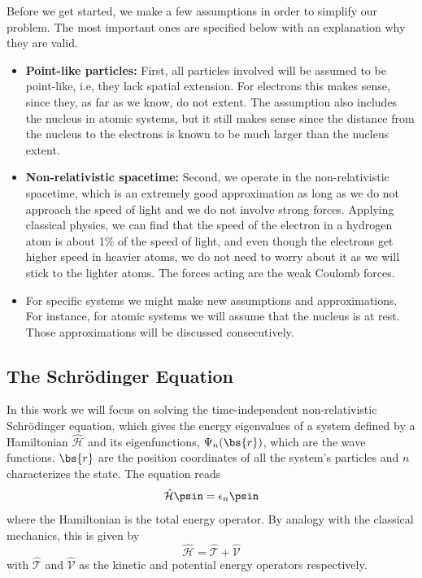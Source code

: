 Before we get started, we make a few assumptions in order to simplify our problem. The most important ones are specified below with an explanation why they are valid.

\begin{itemize}
	\item \textbf{Point-like particles:} First, all particles involved will be assumed to be point-like, i.e, they lack spatial extension. For electrons this makes sense, since they, as far as we know, do not extent. The assumption also includes the nucleus in atomic systems, but it still makes sense since the distance from the nucleus to the electrons is known to be much larger than the nucleus extent.
	
	\item \textbf{Non-relativistic spacetime:}  Second, we operate in the non-relativistic spacetime, which is an extremely good approximation as long as we do not approach the speed of light and we do not involve strong forces. Applying classical physics, we can find that the speed of the electron in a hydrogen atom is about 1\% of the speed of light, and even though the electrons get higher speed in heavier atoms, we do not need to worry about it as we will stick to the lighter atoms. The forces acting are the weak Coulomb forces.
	
	\item For specific systems we might make new assumptions and approximations. For instance, for atomic systems we will assume that the nucleus is at rest. Those approximations will be discussed consecutively. 
\end{itemize}

\subsection{The Schrödinger Equation} \label{subsec:schrodinger}
In this work we will focus on solving the time-independent non-relativistic Schrödinger equation, which gives the energy eigenvalues of a system defined by a Hamiltonian $\hat{\mathcal{H}}$ and its eigenfunctions, $\Psi_n(\bs{r})$, which are the wave functions. $\bs{r}$ are the position coordinates of all the system's particles and $n$ characterizes the state. The equation reads
\begin{equation}
\label{eq:Energy}
 \hat{\mathcal{H}}\psin=\epsilon_n\psin
\end{equation}
where the Hamiltonian is the total energy operator. By analogy with the classical mechanics, this is given by
\begin{equation}
\hat{\mathcal{H}}=\hat{\mathcal{T}}+\hat{\mathcal{V}}
\end{equation}
with $\hat{\mathcal{T}}$ and $\hat{\mathcal{V}}$ as the kinetic and potential energy operators respectively. 

